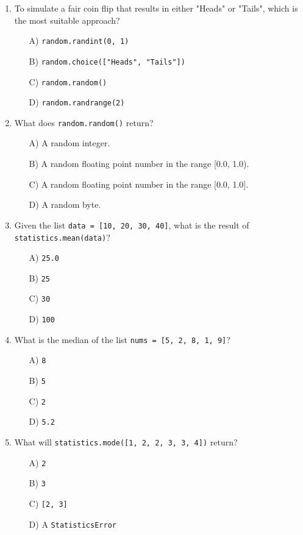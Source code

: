 \documentclass[9pt]{article}
\begin{document}
\begin{multicols}{2}
\begin{enumerate}
\item To simulate a fair coin flip that results in either "Heads" or "Tails", which is the most suitable approach?
\begin{enumerate}
    \item[A)] \texttt{random.randint(0, 1)}
    \item[B)] \texttt{random.choice(["Heads", "Tails"])}
    \item[C)] \texttt{random.random()}
    \item[D)] \texttt{random.randrange(2)}
\end{enumerate}

\item What does \texttt{random.random()} return?
\begin{enumerate}
    \item[A)] A random integer.
    \item[B)] A random floating point number in the range [0.0, 1.0).
    \item[C)] A random floating point number in the range [0.0, 1.0].
    \item[D)] A random byte.
\end{enumerate}

\item Given the list \texttt{data = [10, 20, 30, 40]}, what is the result of \texttt{statistics.mean(data)}?
\begin{enumerate}
    \item[A)] \texttt{25.0}
    \item[B)] \texttt{25}
    \item[C)] \texttt{30}
    \item[D)] \texttt{100}
\end{enumerate}

\item What is the median of the list \texttt{nums = [5, 2, 8, 1, 9]}?
\begin{enumerate}
    \item[A)] \texttt{8}
    \item[B)] \texttt{5}
    \item[C)] \texttt{2}
    \item[D)] \texttt{5.2}
\end{enumerate}

\item What will \texttt{statistics.mode([1, 2, 2, 3, 3, 4])} return?
\begin{enumerate}
    \item[A)] \texttt{2}
    \item[B)] \texttt{3}
    \item[C)] \texttt{[2, 3]}
    \item[D)] A \texttt{StatisticsError}
\end{enumerate}


\end{enumerate}
\end{multicols}
\end{document}
